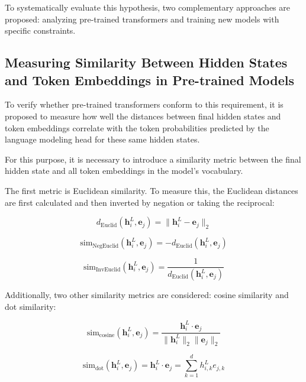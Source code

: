 To systematically evaluate this hypothesis, two complementary approaches are proposed: analyzing pre-trained transformers and training new models with specific constraints.

\subsection{Measuring Similarity Between Hidden States and Token Embeddings in Pre-trained Models}

To verify whether pre-trained transformers conform to this requirement, it is proposed to measure how well the distances between final hidden states and token embeddings correlate with the token probabilities predicted by the language modeling head for these same hidden states.

For this purpose, it is necessary to introduce a similarity metric between the final hidden state and all token embeddings in the model's vocabulary.

The first metric is Euclidean similarity. To measure this, the Euclidean distances are first calculated and then inverted by negation or taking the reciprocal:

\begin{equation}
d_{\text{Euclid}}(\mathbf{h}_i^L, \mathbf{e}_j) = \|\mathbf{h}_i^L - \mathbf{e}_j\|_2
\end{equation}

\begin{equation}
\text{sim}_{\text{NegEuclid}}(\mathbf{h}_i^L, \mathbf{e}_j) = -d_{\text{Euclid}}(\mathbf{h}_i^L, \mathbf{e}_j)
\end{equation}

\begin{equation}
\text{sim}_{\text{InvEuclid}}(\mathbf{h}_i^L, \mathbf{e}_j) = \frac{1}{d_{\text{Euclid}}(\mathbf{h}_i^L, \mathbf{e}_j)}
\end{equation}

Additionally, two other similarity metrics are considered: cosine similarity and dot similarity:

\begin{equation}
\text{sim}_{\text{cosine}}(\mathbf{h}_i^L, \mathbf{e}_j) = \frac{\mathbf{h}_i^L \cdot \mathbf{e}_j}{\|\mathbf{h}_i^L\|_2 \|\mathbf{e}_j\|_2}
\end{equation}

\begin{equation}
\text{sim}_{\text{dot}}(\mathbf{h}_i^L, \mathbf{e}_j) = \mathbf{h}_i^L \cdot \mathbf{e}_j = \sum_{k=1}^{d} h_{i,k}^L e_{j,k}
\end{equation}

